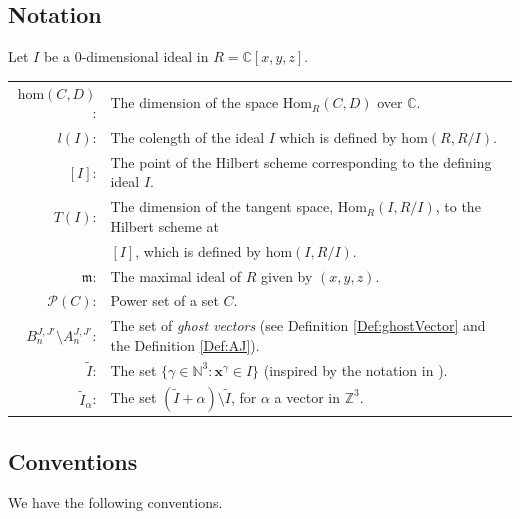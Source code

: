 \documentclass[11pt,a4paper,leqno,noamsfonts]{amsart}
\numberwithin{equation}{section}
\newcommand{\BC}{{\mathbb{C}}}
\newcommand{\BZ}{{\mathbb{Z}}}
\newcommand{\CP}{{\mathcal P}}
\theoremstyle{definition}
\theoremstyle{thm}
\theoremstyle{ex}
\theoremstyle{sol}
\begin{document}
\subsection*{Notation} Let $I$ be a $0$-dimensional ideal in $R=\BC[x,y,z]$.
\begin{center}
    
         \begin{tabular}{ r l }

 $\mathrm{hom}(C,D)$:& The dimension of the space $\mathrm{Hom}_{R}(C,D)$ over $\BC$.\\

          $l(I)$:& The colength of the ideal $I$ which is defined by $\mathrm{hom}(R,R/{I})$.\\

              $[I]$:& The point of the Hilbert scheme corresponding to the defining ideal $I$.\\
          
           $T(I)$:& The dimension of the  tangent space, $\mathrm{Hom}_R(I,R/I)$, to the Hilbert scheme at\\&  $[I]$, which is defined by $\mathrm{hom}(I,R/{I})$.\\

         

         $\mathfrak{m}$:&The maximal ideal of  $R$ given by  $(x,y,z)$.\\
        
         
          $\CP(C)$:& Power set of a set $C$.\\
          $B^{J,J'}_n\setminus A^{J,J'}_n$:& The set of \emph{ghost vectors} (see Definition \ref{Def:ghostVector} and the Definition \ref{Def:AJ}).\\
          $\tilde{I}$:& The set $\{\gamma\in\mathbb{N}^3:\mathbf{x}^\gamma\in I\}$  (inspired by the notation in \cite{Ramkumar-Sammartano}).
          \\
$\tilde{I}_\alpha$:&  The set $(\tilde{I}+\alpha)\setminus\tilde{I}$, for $\alpha$ a vector in $\BZ^3$.
        
    
       
      
                      \end{tabular}
     \end{center}

\subsection*{Conventions} We have the following conventions.
\end{document}
